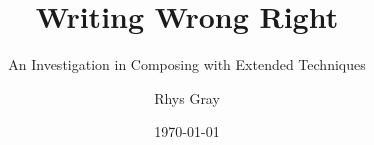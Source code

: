 \documentclass[draft]{turabian-thesis}
\title{Writing Wrong Right}
\subtitle{An Investigation in Composing with Extended Techniques}
\author{Rhys Gray}
\date{\today}
\begin{document}
\frontmatter{}
\maketitle
\tableofcontents{}

\mainmatter{}




















% 

\backmatter{}

\begin{appendixes}
\end{appendixes}

\printbibliography{}
\end{document}
